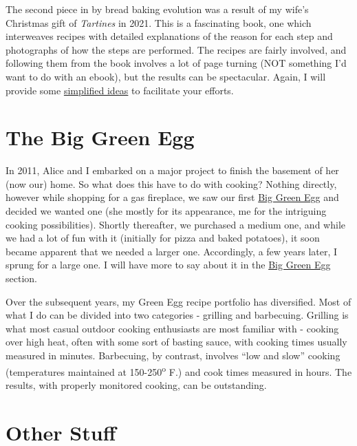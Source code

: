 \documentclass[
]{book}
\begin{document}
The second piece in by bread baking evolution was a result of my wife's Christmas gift of \emph{Tartines} in 2021. This is a fascinating book, one which interweaves recipes with detailed explanations of the reason for each step and photographs of how the steps are performed. The recipes are fairly involved, and following them from the book involves a lot of page turning (NOT something I'd want to do with an ebook), but the results can be spectacular. Again, I will provide some \protect\hyperlink{tartines}{simplified ideas} to facilitate your efforts.

\hypertarget{the-big-green-egg}{%
\section{The Big Green Egg}\label{the-big-green-egg}}

In 2011, Alice and I embarked on a major project to finish the basement of her (now our) home. So what does this have to do with cooking? Nothing directly, however while shopping for a gas fireplace, we saw our first \href{http://www.biggreenegg.com}{Big Green Egg} and decided we wanted one (she mostly for its appearance, me for the intriguing cooking possibilities). Shortly thereafter, we purchased a medium one, and while we had a lot of fun with it (initially for pizza and baked potatoes), it soon became apparent that we needed a larger one. Accordingly, a few years later, I sprung for a large one. I will have more to say about it in the \protect\hyperlink{bge}{Big Green Egg} section.

Over the subsequent years, my Green Egg recipe portfolio has diversified. Most of what I do can be divided into two categories - grilling and barbecuing. Grilling is what most casual outdoor cooking enthusiasts are most familiar with - cooking over high heat, often with some sort of basting sauce, with cooking times usually measured in minutes. Barbecuing, by contrast, involves ``low and slow'' cooking (temperatures maintained at 150-250\textsuperscript{o} F.) and cook times measured in hours. The results, with properly monitored cooking, can be outstanding.

\hypertarget{other-stuff}{%
\section{Other Stuff}\label{other-stuff}}
\end{document}
